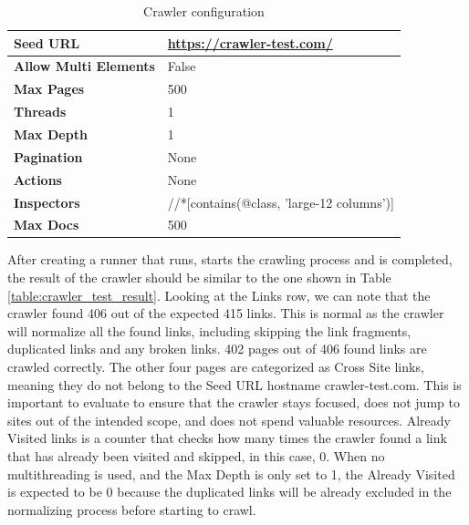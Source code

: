 {\begin{table}[ht] 
{\footnotesize
\begin{tabular}{ P{3cm} ||P{10.1cm}  }      %
 \hline \hline
\textbf{Seed URL} & \href{https://crawler-test.com/}{https://crawler-test.com/}\T\B 
\\ 
\hline
\textbf{Allow Multi Elements} & False \T\B 
\\ 
\hline
\textbf{Max Pages} & 500\T\B 
\\ 
\hline
\textbf{Threads} & 1\T\B 
\\ 
\hline
\textbf{Max Depth} & 1\T\B 
\\ 
\hline
\textbf{Pagination} & None\T\B 
\\ 
\hline
\textbf{Actions} & None\T\B 
\\ 
\hline
\textbf{Inspectors} & //*[contains(@class, 'large-12 columns')]\T\B 
\\ 
\hline
\textbf{Max Docs} & 500\T\B 
\\ 
\hline \hline
    \end{tabular}
}
  \captionsetup{justification=centering,margin=2cm}
  \caption{Crawler configuration}
  \label{table:crawler_test_config}
\end{table}

After creating a runner that runs, starts the crawling process and is completed, the result of the crawler should be similar to the one shown in Table \ref{table:crawler_test_result}. Looking at the Links row, we can note that the crawler found 406 out of the expected 415 links. This is normal as the crawler will normalize all the found links, including skipping the link fragments, duplicated links and any broken links. 402 pages out of 406 found links are crawled correctly. The other four pages are categorized as Cross Site links, meaning they do not belong to the Seed URL hostname crawler-test.com. This is important to evaluate to ensure that the crawler stays focused, does not jump to sites out of the intended scope, and does not spend valuable resources. Already Visited links is a counter that checks how many times the crawler found a link that has already been visited and skipped, in this case, 0. When no multithreading is used, and the Max Depth is only set to 1, the Already Visited is expected to be 0 because the duplicated links will be already excluded in the normalizing process before starting to crawl. 


}
